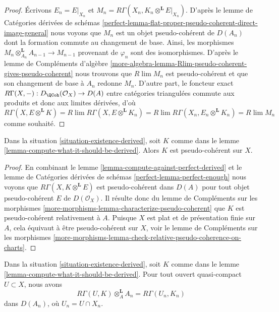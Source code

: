 \begin{proof}
Écrivons $E_n = E|_{X_n}$ et
$M_n = R\Gamma(X_n, K_n \otimes^\mathbf{L} E|_{X_n})$.
D'après le lemme de Catégories dérivées de schémas
\ref{perfect-lemma-flat-proper-pseudo-coherent-direct-image-general}
nous voyons que $M_n$ est un objet pseudo-cohérent de $D(A_n)$
dont la formation commute au changement de base. Ainsi, les morphismes
$M_n \otimes_{A_n}^\mathbf{L} A_{n - 1} \to M_{n - 1}$
provenant de $\varphi_n$ sont des isomorphismes. D'après le
lemme de Compléments d'algèbre
\ref{more-algebra-lemma-Rlim-pseudo-coherent-gives-pseudo-coherent}
nous trouvons que $R\lim M_n$ est pseudo-cohérent et
que son changement de base à $A_n$ redonne $M_n$.
D'autre part, le foncteur exact
$R\Gamma(X, -) : D_\QCoh(\mathcal{O}_X) \to D(A)$
entre catégories triangulées commute aux produits
et donc aux limites dérivées, d'où
$$
R\Gamma(X, E \otimes^\mathbf{L} K) =
R\lim R\Gamma(X,  E \otimes^\mathbf{L} K_n) =
R\lim R\Gamma(X_n, E_n \otimes^\mathbf{L} K_n) =
R\lim M_n
$$
comme souhaité.
\end{proof}

\begin{lemma}
\label{lemma-relative-pseudo-coherence-derived}
Dans la situation \ref{situation-existence-derived}, soit $K$ comme dans le
lemme \ref{lemma-compute-what-it-should-be-derived}. Alors $K$
est pseudo-cohérent sur $X$.
\end{lemma}

\begin{proof}
En combinant le lemme \ref{lemma-compute-against-perfect-derived} et le
lemme de Catégories dérivées de schémas
\ref{perfect-lemma-perfect-enough}
nous voyons que $R\Gamma(X, K \otimes^\mathbf{L} E)$
est pseudo-cohérent dans $D(A)$ pour tout objet pseudo-cohérent
$E$ de $D(\mathcal{O}_X)$. Il résulte donc du
lemme de Compléments sur les morphismes
\ref{more-morphisms-lemma-characterize-pseudo-coherent}
que $K$ est pseudo-cohérent relativement à $A$.
Puisque $X$ est plat et de présentation finie
sur $A$, cela équivaut à être pseudo-cohérent sur $X$, voir le
lemme de Compléments sur les morphismes
\ref{more-morphisms-lemma-check-relative-pseudo-coherence-on-charts}.
\end{proof}

\begin{lemma}
\label{lemma-compute-over-affine-derived}
Dans la situation \ref{situation-existence-derived}, soit $K$ comme dans le
lemme \ref{lemma-compute-what-it-should-be-derived}. Pour tout ouvert quasi-compact
$U \subset X$, nous avons
$$
R\Gamma(U, K) \otimes_A^\mathbf{L} A_n =
R\Gamma(U_n, K_n)
$$
dans $D(A_n)$, où $U_n = U \cap X_n$.
\end{lemma}

